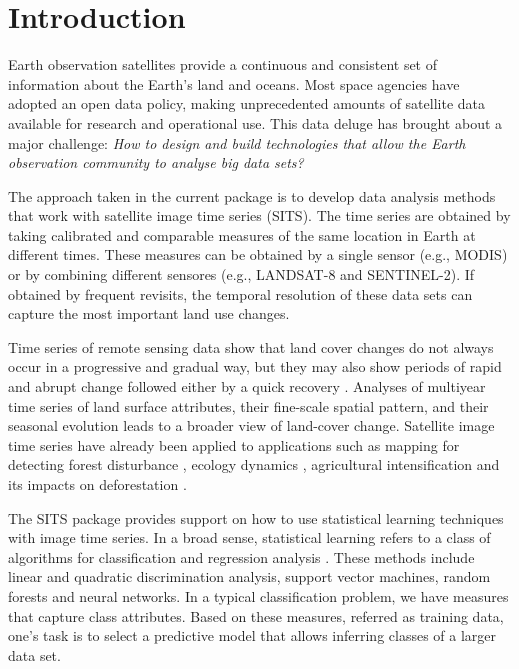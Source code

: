 \documentclass[11pt,]{article}
\begin{document}
\vskip 6.5pt

\setlength{\parskip}{6pt}
\noindent  \section{Introduction}\label{introduction}

Earth observation satellites provide a continuous and consistent set of
information about the Earth's land and oceans. Most space agencies have
adopted an open data policy, making unprecedented amounts of satellite
data available for research and operational use. This data deluge has
brought about a major challenge:
\textit{How to design and build technologies that allow the Earth observation community to analyse big data sets?}

The approach taken in the current package is to develop data analysis
methods that work with satellite image time series (SITS). The time
series are obtained by taking calibrated and comparable measures of the
same location in Earth at different times. These measures can be
obtained by a single sensor (e.g., MODIS) or by combining different
sensores (e.g., LANDSAT-8 and SENTINEL-2). If obtained by frequent
revisits, the temporal resolution of these data sets can capture the
most important land use changes.

Time series of remote sensing data show that land cover changes do not
always occur in a progressive and gradual way, but they may also show
periods of rapid and abrupt change followed either by a quick recovery
\citep{Lambin2003}. Analyses of multiyear time series of land surface
attributes, their fine-scale spatial pattern, and their seasonal
evolution leads to a broader view of land-cover change. Satellite image
time series have already been applied to applications such as mapping
for detecting forest disturbance \citep{Kennedy2010}, ecology dynamics
\citep{Pasquarella2016}, agricultural intensification
\citep{Galford2008} and its impacts on deforestation \citep{Arvor2012}.

The SITS package provides support on how to use statistical learning
techniques with image time series. In a broad sense, statistical
learning refers to a class of algorithms for classification and
regression analysis \citep{Hastie2009}. These methods include linear and
quadratic discrimination analysis, support vector machines, random
forests and neural networks. In a typical classification problem, we
have measures that capture class attributes. Based on these measures,
referred as training data, one's task is to select a predictive model
that allows inferring classes of a larger data set.
\end{document}
